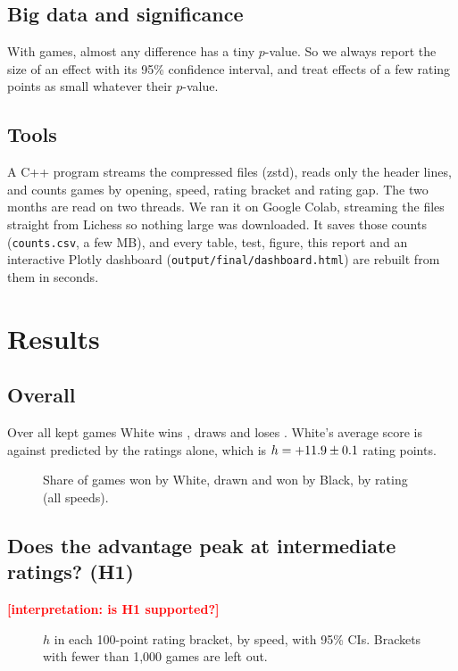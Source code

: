 \documentclass[11pt,a4paper]{article}
\newcommand{\TBD}[1]{\textcolor{red}{\textbf{[#1]}}}
\begin{document}
\FloatBarrier
\subsection{Big data and significance}
With \GamesUsed{} games, almost any difference has a tiny $p$-value. So we always report the
size of an effect with its 95\% confidence interval, and treat effects of a few rating points
as small whatever their $p$-value.

\FloatBarrier
\subsection{Tools}
A C++ program streams the compressed files (zstd), reads only the header lines, and counts
games by opening, speed, rating bracket and rating gap. The two months are read on two threads.
We ran it on Google Colab, streaming the files straight from Lichess so nothing large was
downloaded. It saves those counts (\texttt{counts.csv}, a few MB), and every table, test, figure,
this report and an interactive Plotly dashboard (\texttt{output/final/dashboard.html}) are rebuilt
from them in seconds.

\FloatBarrier
\section{Results}

\FloatBarrier
\subsection{Overall}
Over all kept games White wins \WhiteAll, draws \DrawAll{} and loses \BlackAll. White's average
score is \ScoreAll{} against \ExpectedAll{} predicted by the ratings alone, which is
$h = +11.9 \pm 0.1$ rating points.

\begin{figure}[!htbp]
\centering
\FigResults
\caption{Share of games won by White, drawn and won by Black, by rating (all speeds).}
\end{figure}

\FloatBarrier
\subsection{Does the advantage peak at intermediate ratings? (H1)}
\TBD{interpretation: is H1 supported?}

\begin{figure}[!htbp]
\centering
\FigSpeed
\caption{$h$ in each 100-point rating bracket, by speed, with 95\% CIs. Brackets with fewer than
1,000 games are left out.}
\end{figure}
\end{document}
